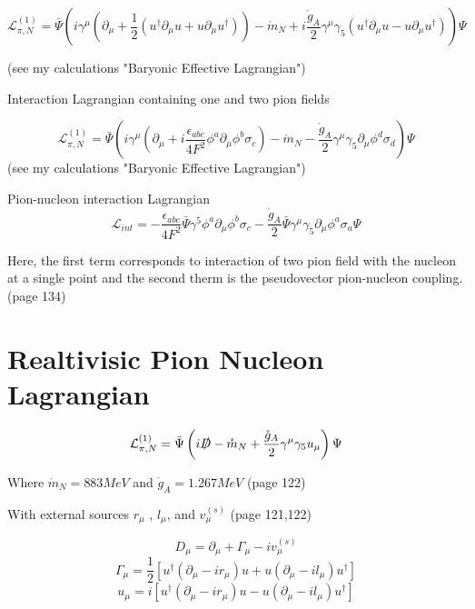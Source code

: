\documentclass{article}
\begin{document}
$$ \mathcal{L}_{\pi,N}^{(1)} = \bar{\Psi} \left( i\gamma^{\mu} \left(  \partial_{\mu} + \frac{1}{2} \left(  u^{\dag} \partial_{\mu} u + u \partial_{\mu} u^{\dag} \right)  \right) 
-\mathring{m}_{N}  
+ i \frac{\mathring{g}_{A}}{2} \gamma^{\mu} \gamma_{5} \left(  u^{\dag} \partial_{\mu} u - u \partial_{\mu} u^{\dag} \right) \right) \Psi$$ 

(see my calculations "Baryonic Effective Lagrangian")

\vspace{10mm}
Interaction Lagrangian containing one and two pion fields

$$ \mathcal{L}_{\pi,N}^{(1)} = \bar{\Psi} \left( i\gamma^{\mu} \left(  \partial_{\mu} + i \frac{\epsilon_{abc}}{4F^{2}} \phi^{a} \partial_{\mu} \phi^{b} \sigma_{c} \right) 
-\mathring{m}_{N}  
- \frac{\mathring{g}_{A}}{2} \gamma^{\mu} \gamma_{5}  \partial_{\mu} \phi^{d} \sigma_{d} \right) \Psi$$
(see my calculations "Baryonic Effective Lagrangian")

\vspace{10mm}
Pion-nucleon interaction Lagrangian
$$ \mathcal{L}_{int} = -\frac{\epsilon_{abc}}{4F^{2}}\bar{\Psi} \gamma^{5} \phi^{a} \partial_{\mu} \phi^{b} \sigma_{c} 
- \frac{\mathring{g}_{A}}{2} \bar{\Psi} \gamma^{\mu} \gamma_{5}  \partial_{\mu} \phi^{a} \sigma_{a} \Psi
$$

Here, the first term corresponds to interaction of two pion field  with the nucleon at a single point and the second therm is the pseudovector pion-nucleon coupling. \cite{scherer2003introduction} (page 134)


\newpage

\section{Realtivisic Pion Nucleon Lagrangian}

$$ \mathcal{L}_{\pi,N}^{(1)} = \bar{\Psi} \left( i\slashed{D} -\mathring{m}_{N}  + \frac{\mathring{g}_{A}}{2} \gamma^{\mu} \gamma_{5} u_{\mu} \right) \Psi$$ 

Where $\mathring{m}_{N}= 883 MeV$ and $\mathring{g}_{A}= 1.267 MeV$ \cite{scherer2003introduction} (page 122)

\vspace{5mm}
With external sources $ r_{\mu}$ , $ l_{\mu}$, and $v_{\mu}^{(s)} $ \cite{scherer2003introduction} (page 121,122)

$$ D_{\mu} = \partial_{\mu} + \Gamma_{\mu} -iv_{\mu}^{(s)}$$
$$ \Gamma_{\mu} = \frac{1}{2} \left[  u^{\dag} (\partial_{\mu}-ir_{\mu}) u + u (\partial_{\mu}-il_{\mu} ) u^{\dag} \right] $$
$$ u_{\mu} = i \left[  u^{\dag} (\partial_{\mu}-ir_{\mu}) u - u (\partial_{\mu}-il_{\mu} ) u^{\dag} \right]   $$
\end{document}
